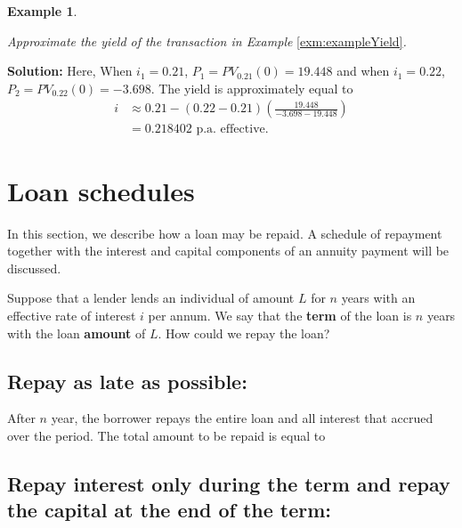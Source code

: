 \documentclass[
]{book}
\theoremstyle{definition}
\theoremstyle{definition}
\newtheorem{example}{Example}[chapter]
\theoremstyle{definition}
\theoremstyle{definition}
\theoremstyle{remark}
\begin{document}
\begin{example}
\protect\hypertarget{exm:unlabeled-div-47}{}\label{exm:unlabeled-div-47}

\emph{Approximate the yield of the transaction in Example}
\ref{exm:exampleYield}\emph{.}

\end{example}

\textbf{Solution:} Here, When \(i_1 = 0.21\), \(P_1 = PV_{0.21}(0) = 19.448\) and
when \(i_1 = 0.22\), \(P_2 = PV_{0.22}(0) = -3.698.\) The yield is
approximately equal to \[\begin{aligned}
 i &\approx 0.21 - (0.22 - 0.21) \left(  \frac{19.448}{-3.698 - 19.448} \right) \\
   &= 0.218402 \text{ p.a. effective.}\end{aligned}\]

\hypertarget{loan-schedules}{%
\section{Loan schedules}\label{loan-schedules}}

In this section, we describe how a loan may be repaid. A schedule of
repayment together with the interest and capital components of an
annuity payment will be discussed.

Suppose that a lender lends an individual of amount \(L\) for \(n\) years
with an effective rate of interest \(i\) per annum. We say that the
\textbf{term} of the loan is \(n\) years with the loan \textbf{amount} of \(L\). How
could we repay the loan?

\hypertarget{repay-as-late-as-possible}{%
\subsection*{Repay as late as possible:}\label{repay-as-late-as-possible}}

After \(n\) year, the borrower repays the entire loan and all interest
that accrued over the period. The total amount to be repaid is equal to

\hypertarget{repay-interest-only-during-the-term-and-repay-the-capital-at-the-end-of-the-term}{%
\subsection*{Repay interest only during the term and repay the capital at the end of the term:}\label{repay-interest-only-during-the-term-and-repay-the-capital-at-the-end-of-the-term}}
\end{document}
